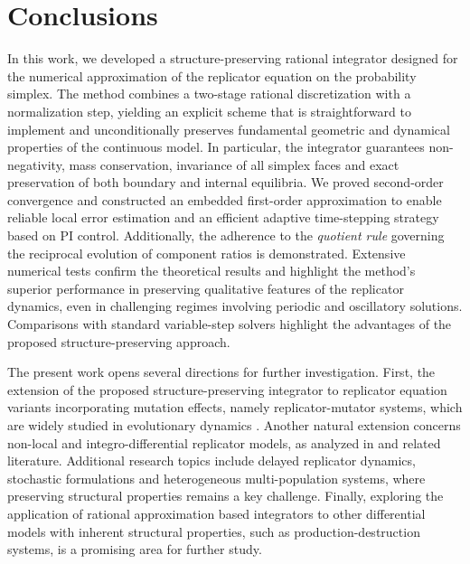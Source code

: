 \documentclass[11pt,letterpaper]{article}
\theoremstyle{remark}
\begin{document}
\section{Conclusions}\label{sec:Conclusions}

In this work, we developed a structure-preserving rational integrator designed for the numerical approximation of the replicator equation on the probability simplex. The method combines a two-stage rational discretization with a normalization step, yielding an explicit scheme that is straightforward to implement and unconditionally preserves fundamental geometric and dynamical properties of the continuous model. In particular, the integrator guarantees non-negativity, mass conservation, invariance of all simplex faces and exact preservation of both boundary and internal equilibria. We proved second-order convergence and constructed an embedded first-order approximation to enable reliable local error estimation and an efficient adaptive time-stepping strategy based on PI control. Additionally, the adherence to the \emph{quotient rule} governing the reciprocal evolution of component ratios is demonstrated. Extensive numerical tests confirm the theoretical results and highlight the method’s superior performance in preserving qualitative features of the replicator dynamics, even in challenging regimes involving periodic and oscillatory solutions. Comparisons with standard variable-step solvers highlight the advantages of the proposed structure-preserving approach.

The present work opens several directions for further investigation. First, the extension of the proposed structure-preserving integrator to replicator equation variants incorporating mutation effects, namely replicator-mutator systems, which are widely studied in evolutionary dynamics \cite{Amadori_Mutations_1, Amadori_Mutations_2}. Another natural extension concerns non-local and integro-differential replicator models, as analyzed in \cite{AMADORI_BRIANI_NATALINI_2016,Alfaro_2023,Alfaro_2020} and related literature. Additional research topics include delayed replicator dynamics, stochastic formulations and heterogeneous multi-population systems, where preserving structural properties remains a key challenge. Finally, exploring the application of rational approximation based integrators to other differential models with inherent structural properties, such as production-destruction \cite{PDS,OFFNER202015,MPSL,GeCO_Izgin} systems, is a promising area for further study. 
\medskip
\end{document}
